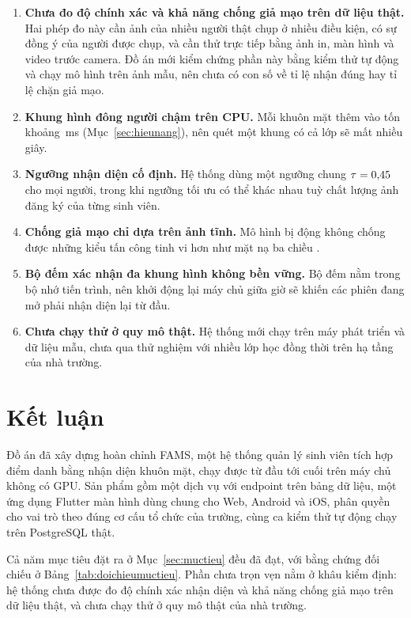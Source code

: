\begin{enumerate}[leftmargin=1.8em, itemsep=3pt]
  \item \textbf{Chưa đo độ chính xác và khả năng chống giả mạo trên dữ liệu
        thật.} Hai phép đo này cần ảnh của nhiều người thật chụp ở nhiều điều
        kiện, có sự đồng ý của người được chụp, và cần thử trực tiếp bằng ảnh
        in, màn hình và video trước camera. Đồ án mới kiểm chứng phần này bằng
        kiểm thử tự động và chạy mô hình trên ảnh mẫu, nên chưa có con số về tỉ
        lệ nhận đúng hay tỉ lệ chặn giả mạo.
  \item \textbf{Khung hình đông người chậm trên CPU.} Mỗi khuôn mặt thêm vào
        tốn khoảng \HnMoiMatThem{}\,ms (Mục~\ref{sec:hieunang}), nên quét một
        khung có cả lớp sẽ mất nhiều giây.
  \item \textbf{Ngưỡng nhận diện cố định.} Hệ thống dùng một ngưỡng chung
        $\tau = 0{,}45$ cho mọi người, trong khi ngưỡng tối ưu có
        thể khác nhau tuỳ chất lượng ảnh đăng ký của từng sinh viên.
  \item \textbf{Chống giả mạo chỉ dựa trên ảnh tĩnh.} Mô hình bị động không
        chống được những kiểu tấn công tinh vi hơn như mặt nạ ba chiều \cite{Ramachandra2017Survey}.
  \item \textbf{Bộ đếm xác nhận đa khung hình không bền vững.} Bộ đếm nằm
        trong bộ nhớ tiến trình, nên khởi động lại máy chủ giữa giờ sẽ khiến
        các phiên đang mở phải nhận diện lại từ đầu.
  \item \textbf{Chưa chạy thử ở quy mô thật.} Hệ thống mới chạy trên máy phát
        triển và dữ liệu mẫu, chưa qua thử nghiệm với nhiều lớp học đồng thời
        trên hạ tầng của nhà trường.
\end{enumerate}

\section{Kết luận}

Đồ án đã xây dựng hoàn chỉnh FAMS, một hệ thống quản lý sinh viên tích hợp
điểm danh bằng nhận diện khuôn mặt, chạy được từ đầu tới cuối trên máy chủ
không có GPU. Sản phẩm gồm một dịch vụ với \FsoEndpoint{} endpoint trên
\FsoBang{} bảng dữ liệu, một ứng dụng Flutter \FsoManHinh{} màn hình dùng
chung cho Web, Android và iOS, phân quyền cho \FsoVaiTro{} vai trò theo đúng
cơ cấu tổ chức của trường, cùng \FsoTest{} ca kiểm thử tự động chạy trên
PostgreSQL thật.

Cả năm mục tiêu đặt ra ở Mục~\ref{sec:muctieu} đều đã đạt, với bằng chứng
đối chiếu ở Bảng~\ref{tab:doichieumuctieu}. Phần chưa trọn vẹn nằm ở khâu
kiểm định: hệ thống chưa được đo độ chính xác nhận diện và khả năng chống giả
mạo trên dữ liệu thật, và chưa chạy thử ở quy mô thật của nhà trường.

